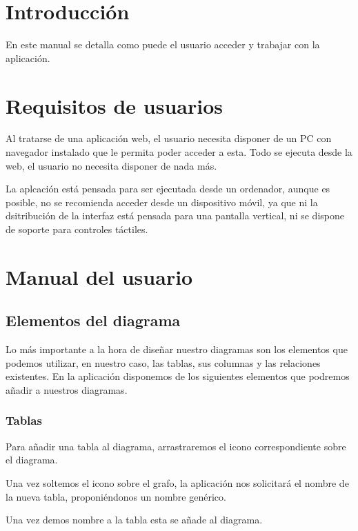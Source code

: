 
\section{Introducción}
En este manual se detalla como puede el usuario acceder y trabajar con la aplicación.

\section{Requisitos de usuarios}
Al tratarse de una aplicación web, el usuario necesita disponer de un PC con navegador instalado que le permita poder acceder a esta. Todo se ejecuta desde la web, el usuario no necesita disponer de nada más.

La aplcación está pensada para ser ejecutada desde un ordenador, aunque es posible, no se recomienda acceder desde un dispositivo móvil, ya que ni la dsitribución de la interfaz está pensada para una pantalla vertical, ni se dispone de soporte para controles táctiles.

\section{Manual del usuario}


\subsection{Elementos del diagrama}
Lo más importante a la hora de diseñar nuestro diagramas son los elementos que podemos utilizar, en nuestro caso, las tablas, sus columnas y las relaciones existentes. En la aplicación disponemos de los siguientes elementos que podremos añadir a nuestros diagramas.

\subsubsection{Tablas}
Para añadir una tabla al diagrama, arrastraremos el icono correspondiente sobre el diagrama.


Una vez soltemos el icono sobre el grafo, la aplicación nos solicitará el nombre de la nueva tabla, proponiéndonos un nombre genérico.


Una vez demos nombre a la tabla esta se añade al diagrama.


